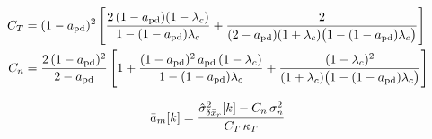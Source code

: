 \[
\begin{aligned}
C_T &= (1-a_{\mathrm{pd}})^2\left[\frac{2\,(1-a_{\mathrm{pd}})(1-\lambda_c)}{1-(1-a_{\mathrm{pd}})\lambda_c} + \frac{2}{(2-a_{\mathrm{pd}})(1+\lambda_c)\big(1-(1-a_{\mathrm{pd}})\lambda_c\big)}\right] \\
C_n &= \frac{2\,(1-a_{\mathrm{pd}})^2}{2-a_{\mathrm{pd}}}\left[1 + \frac{(1-a_{\mathrm{pd}})^2\,a_{\mathrm{pd}}\,(1-\lambda_c)}{1-(1-a_{\mathrm{pd}})\lambda_c} + \frac{(1-\lambda_c)^2}{(1+\lambda_c)\big(1-(1-a_{\mathrm{pd}})\lambda_c\big)}\right]
\end{aligned}
\]

\[
\bar{a}_m[k] = \frac{\hat\sigma^2_{\delta\bar{x}_r}[k] - C_n\,\sigma^2_{n}}{C_T\,\kappa_T}
\]

